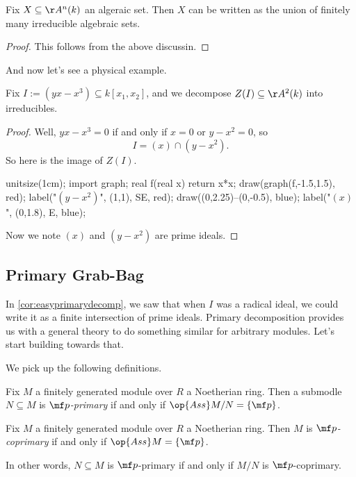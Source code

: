\begin{corollary}
	Fix $X\subseteq\AA^n(k)$ an algeraic set. Then $X$ can be written as the union of finitely many irreducible algebraic sets.
\end{corollary}
\begin{proof}
	This follows from the above discussin.
\end{proof}
And now let's see a physical example.
\begin{exe}
	Fix $I:=\left(yx-x^3\right)\subseteq k[x_1,x_2]$, and we decompose $Z(I)\subseteq\AA^2(k)$ into irreducibles.
\end{exe}
\begin{proof}
	Well, $yx-x^3=0$ if and only if $x=0$ or $y-x^2=0$, so
	\[I=(x)\cap\left(y-x^2\right).\]
	So here is the image of $Z(I)$.
	\begin{center}
		\begin{asy}
			unitsize(1cm);
			import graph;
			real f(real x)
			{
				return x*x;
			}
			draw(graph(f,-1.5,1.5), red);
			label("$\left(y-x^2\right)$", (1,1), SE, red);
			draw((0,2.25)--(0,-0.5), blue);
			label("$(x)$", (0,1.8), E, blue);
		\end{asy}
	\end{center}
	Now we note $(x)$ and $\left(y-x^2\right)$ are prime ideals.
\end{proof}

\subsection{Primary Grab-Bag}
In \autoref{cor:easyprimarydecomp}, we saw that when $I$ was a radical ideal, we could write it as a finite intersection of prime ideals. Primary decomposition provides us with a general theory to do something similar for arbitrary modules. Let's start building towards that.

We pick up the following definitions.
\begin{definition}
	Fix $M$ a finitely generated module over $R$ a Noetherian ring. Then a submodle $N\subseteq M$ is \textit{$\mf p$-primary} if and only if $\op{Ass}M/N=\{\mf p\}$.
\end{definition}
\begin{definition}
	Fix $M$ a finitely generated module over $R$ a Noetherian ring. Then $M$ is \textit{$\mf p$-coprimary} if and only if $\op{Ass}M=\{\mf p\}$.
\end{definition}
In other words, $N\subseteq M$ is $\mf p$-primary if and only if $M/N$ is $\mf p$-coprimary.


